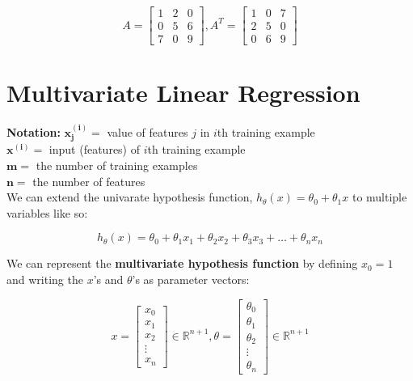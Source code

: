 \documentclass{article}
\begin{document}
        \begin{equation*}
            A =
            \begin{bmatrix}
                1 & 2 & 0 \\
                0 & 5 & 6 \\
                7 & 0 & 9
            \end{bmatrix}
            , A^T =
            \begin{bmatrix}
                1 & 0 & 7 \\
                2 & 5 & 0 \\
                0 & 6 & 9
            \end{bmatrix}
        \end{equation*}



    \pagebreak
    \section{Multivariate Linear Regression}
        \textbf{Notation:}
        $\bm{x_j^{(i)}}=$ value of features $j$ in $i$th training example \\
        $\bm{x^{(i)}}=$ input (features) of $i$th training example \\
        $\bm{m}=$ the number of training examples \\
        $\bm{n}=$ the number of features \\

        \noindent We can extend the univarate hypothesis function, $h_\theta(x)=\theta_0+\theta_1 x $ to
        multiple variables like so:

        \begin{equation*}
            h_{\theta}(x) = \theta_0 + \theta_1 x_1 + \theta_2 x_2 + \theta_3 x_3+\dots+\theta_n x_n
        \end{equation*}

        \noindent We can represent the \textbf{multivariate hypothesis function} by defining $x_0=1$ and
        writing the $x$'s and $\theta$'s as parameter vectors:

        \begin{equation*}
            x = \begin{bmatrix}
                    x_0 \\
                    x_1 \\
                    x_2 \\
                    \vdots \\
                    x_n
                \end{bmatrix}
            \in\mathbb{R}^{n+1}
            ,\theta = \begin{bmatrix}
                          \theta_0 \\
                          \theta_1 \\
                          \theta_2 \\
                          \vdots \\
                          \theta_n
                      \end{bmatrix}
            \in\mathbb{R}^{n+1}
        \end{equation*}
\end{document}
